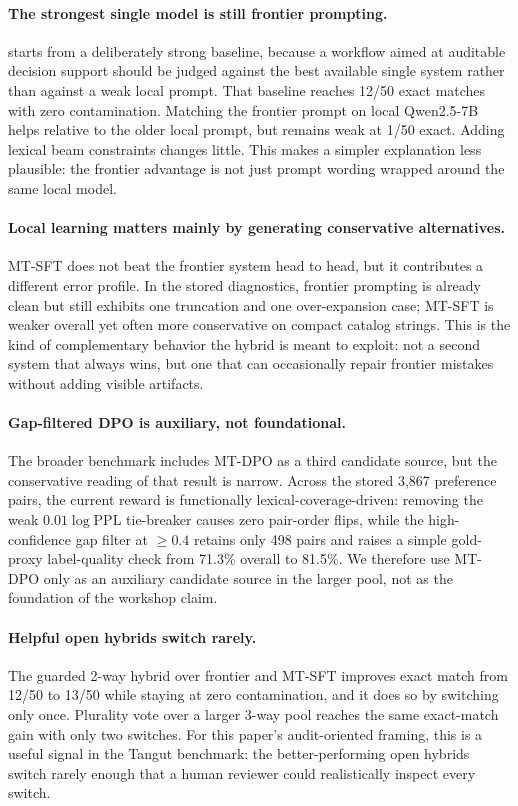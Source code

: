\documentclass{article}
\begin{document}
\paragraph{The strongest single model is still frontier prompting.}
 starts from a deliberately strong baseline, because a workflow aimed at auditable decision support should be judged against the best available single system rather than against a weak local prompt. That baseline reaches 12/50 exact matches with zero contamination. Matching the frontier prompt on local Qwen2.5-7B helps relative to the older local prompt, but remains weak at 1/50 exact. Adding lexical beam constraints changes little. This makes a simpler explanation less plausible: the frontier advantage is not just prompt wording wrapped around the same local model.

\paragraph{Local learning matters mainly by generating conservative alternatives.}
MT-SFT does not beat the frontier system head to head, but it contributes a different error profile. In the stored diagnostics, frontier prompting is already clean but still exhibits one truncation and one over-expansion case; MT-SFT is weaker overall yet often more conservative on compact catalog strings. This is the kind of complementary behavior the hybrid is meant to exploit: not a second system that always wins, but one that can occasionally repair frontier mistakes without adding visible artifacts.

\paragraph{Gap-filtered DPO is auxiliary, not foundational.}
The broader benchmark includes MT-DPO as a third candidate source, but the conservative reading of that result is narrow. Across the stored 3,867 preference pairs, the current reward is functionally lexical-coverage-driven: removing the weak $0.01 \log \mathrm{PPL}$ tie-breaker causes zero pair-order flips, while the high-confidence gap filter at $\ge 0.4$ retains only 498 pairs and raises a simple gold-proxy label-quality check from 71.3\% overall to 81.5\%. We therefore use MT-DPO only as an auxiliary candidate source in the larger pool, not as the foundation of the workshop claim.

\paragraph{Helpful open hybrids switch rarely.}
The guarded 2-way hybrid over frontier and MT-SFT improves exact match from 12/50 to 13/50 while staying at zero contamination, and it does so by switching only once. Plurality vote over a larger 3-way pool reaches the same exact-match gain with only two switches. For this paper's audit-oriented framing, this is a useful signal in the Tangut benchmark: the better-performing open hybrids switch rarely enough that a human reviewer could realistically inspect every switch.
\end{document}
